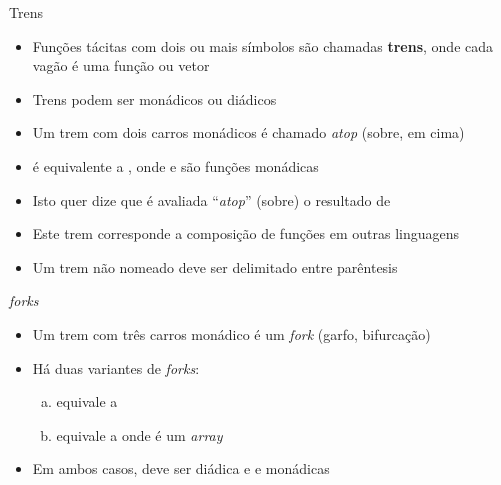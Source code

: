 \begin{frame}[fragile]{Trens}

    \begin{itemize}
        \item Funções tácitas com dois ou mais símbolos são chamadas \textbf{trens}, onde cada vagão é uma função ou vetor
        \pause

        \item Trens podem ser monádicos ou diádicos
        \pause

        \item Um trem com dois carros monádicos é chamado \textit{atop} (sobre, em cima)
        \pause

        \item {} é equivalente a , onde  e  são funções monádicas
        \pause

        \item Isto quer dize que  é avaliada ``\textit{atop}'' (sobre) o resultado de 
        \pause

        \item Este trem corresponde a composição de funções em outras linguagens
        \pause

        \item Um trem não nomeado deve ser delimitado entre parêntesis
    \end{itemize}

\end{frame}

\begin{frame}[fragile]{\it forks}

    \begin{itemize}
        \item Um trem com três carros monádico é um \textit{fork} (garfo, bifurcação)
        \pause

        \item Há duas variantes de \textit{forks}:

        \begin{enumerate}[(a)]
            \item {} equivale a 
            \pause

            \item  {} equivale a  onde  é um \textit{array}
        \end{enumerate}
        \pause

        \item Em ambos casos,  deve ser diádica e  e  monádicas
    \end{itemize}

\end{frame}

